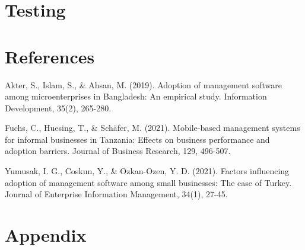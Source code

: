\documentclass{article}
\begin{document}
\section*{Testing}
\lipsum[1-2]
\newpage


\section*{References}
\begin{thebibliography}{10}
	

	Akter, S., Islam, S., \& Ahsan, M. (2019). Adoption of management software among microenterprises in Bangladesh: An empirical study. Information Development, 35(2), 265-280.

	Fuchs, C., Huesing, T., \& Schäfer, M. (2021). Mobile-based management systems for informal businesses in Tanzania: Effects on business performance and adoption barriers. Journal of Business Research, 129, 496-507.

	Yumusak, I. G., Coskun, Y., \& Ozkan-Ozen, Y. D. (2021). Factors influencing adoption of management software among small businesses: The case of Turkey. Journal of Enterprise Information Management, 34(1), 27-45.

\end{thebibliography}


\newpage

\section{Appendix}
\lipsum[1-2]
\newpage
\end{document}
